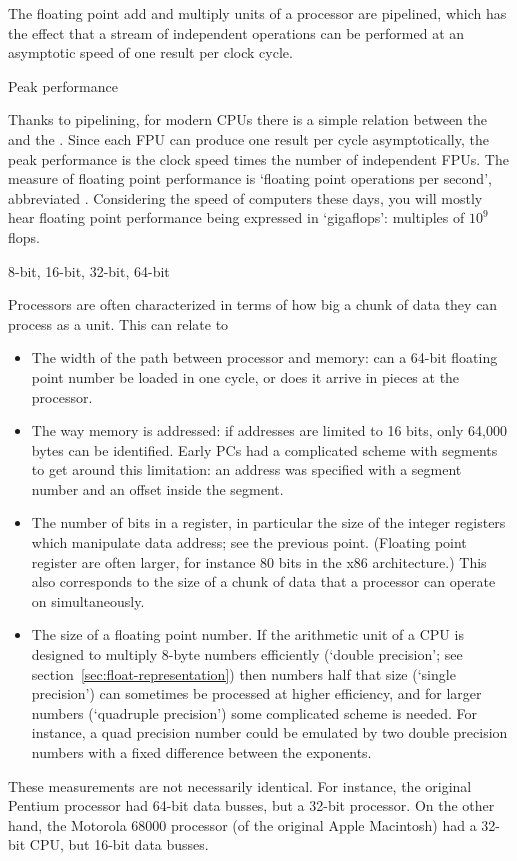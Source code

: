 The floating point add and multiply units of a processor are
pipelined, which has the effect that a stream of independent
operations can be performed at an asymptotic speed of one result per
clock cycle.




 {Peak performance}

Thanks to pipelining, for modern CPUs there is a simple relation
between the  and the .
Since each \ac{FPU} can produce one result per cycle
asymptotically, the peak performance is the clock speed times the
number of independent \acp{FPU}. The measure of floating
point performance is `floating point operations per second',
abbreviated . Considering the speed of computers
these days, you will mostly hear floating point performance being
expressed in `gigaflops': multiples of $10^9$ flops.

 {8-bit, 16-bit, 32-bit, 64-bit}

Processors are often characterized in terms of how big a chunk of data
they can process as a unit. This can relate to
\begin{itemize}
\item The width of the path between processor and memory: can a 64-bit
  floating point number be loaded in one cycle, or does it arrive in
  pieces at the processor.
\item The way memory is addressed: if addresses are limited to 16
  bits, only 64,000 bytes can be identified. Early PCs had a
  complicated scheme with segments to get around this limitation: an
  address was specified with a segment number and an offset inside the segment.
\item The number of bits in a register, in particular the size of the
  integer registers which manipulate data address; see the previous
  point. (Floating point register are often larger, for instance 80
  bits in the x86 architecture.) This also corresponds to the size of
  a chunk of data that a processor can operate on simultaneously.
\item The size of a floating point number. If the arithmetic unit of a
  CPU is designed to multiply 8-byte numbers efficiently (`double
  precision'; see section~\ref{sec:float-representation}) then numbers half
  that size (`single precision') can sometimes be processed at higher
  efficiency, and for larger numbers (`quadruple precision') some
  complicated scheme is needed. For instance, a quad precision number
  could be emulated by two double precision numbers with a fixed
  difference between the exponents.
\end{itemize}
These measurements are not necessarily identical. For instance, the
original Pentium processor had 64-bit data busses, but a 32-bit
processor. On the other hand, the Motorola 68000 processor (of the
original Apple Macintosh) had a 32-bit CPU, but 16-bit data busses.

